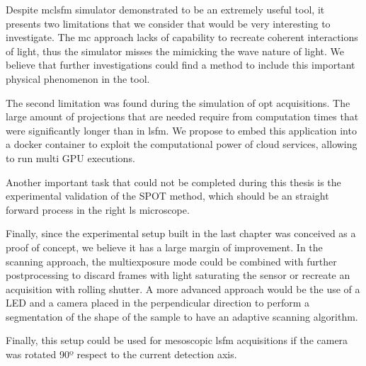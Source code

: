 Despite \gls{mclsfm} simulator demonstrated to be an extremely useful tool, it presents two limitations that we consider that would be very interesting to investigate. The \gls{mc} approach lacks of capability to recreate coherent interactions of light, thus the simulator misses the mimicking the wave nature of light. We believe that further investigations could find a method to include this important physical phenomenon in the tool.

The second limitation was found during the simulation of \gls{opt} acquisitions. The large amount of projections that are needed require from computation times that were significantly longer than in \gls{lsfm}. We propose to embed this application into a docker container to exploit the computational power of cloud services, allowing to run multi GPU executions.

Another important task that could not be completed during this thesis is the experimental validation of the SPOT method, which should be an straight forward process in the right \gls{ls} microscope.

Finally, since the experimental setup built in the last chapter was conceived as a proof of concept, we believe it has a large margin of improvement. In the scanning approach, the multiexposure mode could be combined with further postprocessing to discard frames with light saturating the sensor or recreate an acquisition with rolling shutter. A more advanced approach would be the use of a LED and a camera placed in the perpendicular direction to perform a segmentation of the shape of the sample to have an adaptive scanning algorithm.

Finally, this setup could be used for mesoscopic \gls{lsfm} acquisitions if the camera was rotated 90º respect to the current detection axis.